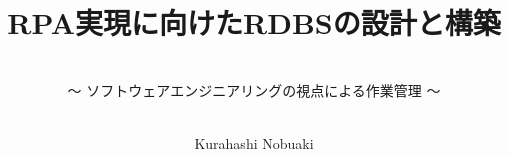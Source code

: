 
\titlehead{\hfill\small\customdate}

\subject{\Large--- 事務的な定常業務の自動化 ---}

\title{\huge RPA実現に向けたRDBSの設計と構築}

\subtitle{\ \\\normalsize～ ソフトウェアエンジニアリングの視点による作業管理 ～}

\date{}

\publishers{}

\author{\ \\\small Kurahashi Nobuaki}

\uppertitleback{\small
This document was created using \TeX{} (\linkLaTeX\kern.15em2$_{\textstyle\varepsilon}$), specifically utilizing tools such as \linkTeXLive{} 2023, up\LaTeX, \linkBibLaTeX\ (\linkBiber), \linkPGFTikZ, and many useful packages, and \linkTeXStudio.\\
Numerical calculations were performed using \linkExcel{} and \linkPython.\\
The source codes for the G-code programs were written using \linkVSCode.\\
Version control for these documents was managed using \linkGitHub.\\
The environment for these tools was managed using \linkDocker{} and \linkUbuntu.\\
The database used was \linkSQLite.\\
Thanks to these tools, with the all-around support of  (\linkBingChat), the creation of this document and system was made possible.
}

